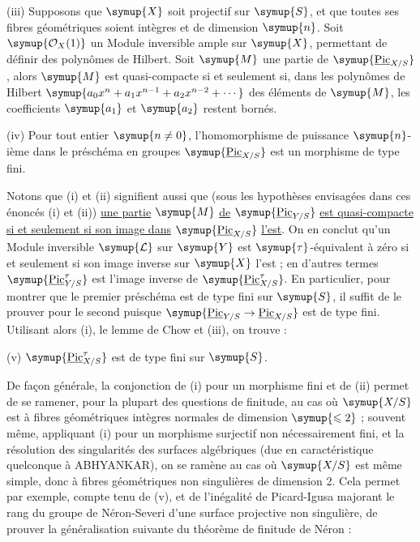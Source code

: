 \noindent(iii) Supposons que $\symup{X}$ soit projectif sur $\symup{S}$, et que toutes ses
fibres géométriques soient intègres et de dimension $\symup{n}$. Soit
$\symup{\mathcal O_X(1)}$ un Module inversible ample sur $\symup{X}$, permettant de définir
des polynômes de Hilbert. Soit $\symup{M}$ une partie de
$\symup{\underline{\operatorname{Pic}}_{X/S}}$, alors $\symup{M}$ est quasi-compacte si et seulement si,
dans les polynômes de Hilbert
$\symup{a_0x^n+a_1x^{n-1}+a_2x^{n-2}+\cdots}$
des éléments de $\symup{M}$, les coefficients $\symup{a_1}$ et $\symup{a_2}$ restent bornés.

\noindent(iv) Pour tout entier $\symup{n\neq0}$, l'homomorphisme de puissance
$\symup{n}$-ième dans le préschéma en groupes $\symup{\underline{\operatorname{Pic}}_{X/S}}$ est un
morphisme de type fini.

Notons que (i) et (ii) signifient aussi que (sous les hypothèses envisagées
dans ces énoncés (i) et (ii)) \uline{une partie} $\symup{M}$ \uline{de}
$\symup{\underline{\operatorname{Pic}}_{Y/S}}$ \uline{est quasi-compacte si et seulement si son image
dans} $\symup{\underline{\operatorname{Pic}}_{X/S}}$ \uline{l'est}. On en conclut qu'un Module inversible
$\symup{\mathcal L}$ sur $\symup{Y}$ est $\symup{\tau}$-équivalent à zéro si et seulement si son image
inverse sur $\symup{X}$ l'est ; en d'autres termes
$\symup{\underline{\operatorname{Pic}}_{Y/S}^\tau}$ est l'image inverse de
$\symup{\underline{\operatorname{Pic}}_{X/S}^\tau}$. En particulier, pour montrer que le premier
préschéma est de type fini sur $\symup{S}$, il suffit de le prouver pour le second
puisque $\symup{\underline{\operatorname{Pic}}_{Y/S}\to 
\underline{\operatorname{Pic}}_{X/S}}$ est de type fini. Utilisant alors (i), le lemme de
Chow et (iii), on trouve :

\medskip
\noindent(v) $\symup{\underline{\operatorname{Pic}}_{X/S}^\tau}$ est de type fini sur $\symup{S}$.

De façon générale, la conjonction de (i) pour un morphisme fini et de (ii)
permet de se ramener, pour la plupart des questions de finitude, au cas où
$\symup{X/S}$ est à fibres géométriques intègres normales de dimension $\symup{\leqslant2}$ ;
souvent même, appliquant (i) pour un morphisme surjectif non nécessairement
fini, et la résolution des singularités des surfaces algébriques (due en
caractéristique quelconque à ABHYANKAR), on se ramène au cas où $\symup{X/S}$ est même
simple, donc à fibres géométriques non singulières de dimension 2. Cela permet
par exemple, compte tenu de (v), et de l'inégalité de Picard-Igusa majorant le
rang du groupe de Néron-Severi d'une surface projective non singulière, de
prouver la généralisation suivante du théorème de finitude de Néron :

